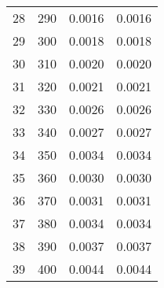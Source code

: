 \begin{table}
\begin{adjustbox}{width=1\textwidth/2}
\begin{tabular}{|c|c|c|c|}
\cline{1-4}
28 & 290 & 0.0016 & 0.0016 \\
\cline{1-4}
29 & 300 & 0.0018 & 0.0018 \\
\cline{1-4}
30 & 310 & 0.0020 & 0.0020 \\
\cline{1-4}
31 & 320 & 0.0021 & 0.0021 \\
\cline{1-4}
32 & 330 & 0.0026 & 0.0026 \\
\cline{1-4}
33 & 340 & 0.0027 & 0.0027 \\
\cline{1-4}
34 & 350 & 0.0034 & 0.0034 \\
\cline{1-4}
35 & 360 & 0.0030 & 0.0030 \\
\cline{1-4}
36 & 370 & 0.0031 & 0.0031 \\
\cline{1-4}
37 & 380 & 0.0034 & 0.0034 \\
\cline{1-4}
38 & 390 & 0.0037 & 0.0037 \\
\cline{1-4}
39 & 400 & 0.0044 & 0.0044 \\
\cline{1-4}
\end{tabular}
\end{adjustbox}
\end{table}

